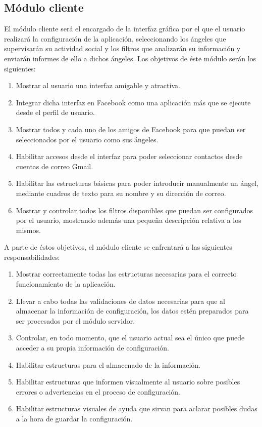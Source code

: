 \subsection{Módulo cliente}
El módulo cliente será el encargado de la interfaz gráfica por el que el usuario realizará la configuración de la aplicación, seleccionando los ángeles que supervisarán su actividad social y los filtros que analizarán su información y enviarán informes de ello a dichos ángeles. Los objetivos de éste módulo serán los siguientes:
\begin{enumerate}
\item Mostrar al usuario una interfaz amigable y atractiva.
\item Integrar dicha interfaz en Facebook como una aplicación más que se ejecute desde el perfil de usuario.
\item Mostrar todos y cada uno de los amigos de Facebook para que puedan ser seleccionados por el usuario como sus ángeles.
\item Habilitar accesos desde el interfaz para poder seleccionar contactos desde cuentas de correo Gmail.
\item Habilitar las estructuras básicas para poder introducir manualmente un ángel, mediante cuadros de texto para su nombre y su dirección de correo.
\item Mostrar y controlar todos los filtros disponibles que puedan ser configurados por el usuario, mostrando además una pequeña descripción relativa a los mismos.
\end{enumerate}
\bigskip
\par
A parte de éstos objetivos, el módulo cliente se enfrentará a las siguientes responsabilidades:
\begin{enumerate}
\item Mostrar correctamente todas las estructuras necesarias para el correcto funcionamiento de la aplicación.
\item Llevar a cabo todas las validaciones de datos necesarias para que al almacenar la información de configuración, los datos estén preparados para ser procesados por el módulo servidor.
\item Controlar, en todo momento, que el usuario actual sea el único que puede acceder a su propia información de configuración.
\item Habilitar estructuras para el almacenado de la información.
\item Habilitar estructuras que informen visualmente al usuario sobre posibles errores o advertencias en el proceso de configuración. 
\item Habilitar estructuras visuales de ayuda que sirvan para aclarar posibles dudas a la hora de guardar la configuración.
\end{enumerate}
